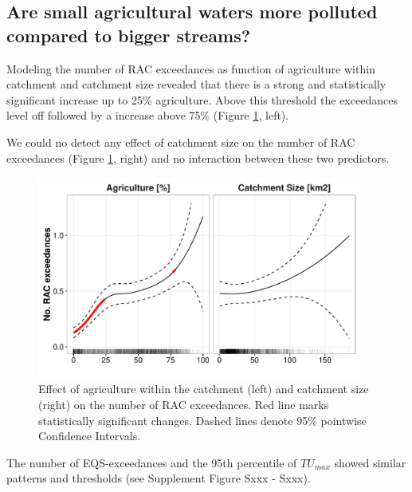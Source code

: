 \documentclass[journal=esthag,manuscript=article]{achemso}
\begin{document}
\subsection{Are small agricultural waters more polluted compared to bigger streams?}

Modeling the number of RAC exceedances as function of agriculture within catchment and catchment size revealed that there is a strong and statistically significant increase up to 25\% agriculture.
Above this threshold the exceedances level off followed by a increase above 75\% (Figure \ref{fig:fig4}, left).

We could no detect any effect of catchment size on the number of RAC exceedances (Figure \ref{fig:fig4}, right) and no interaction between these two predictors.

\begin{figure}[ht]
  \includegraphics[width=0.95\textwidth]{figure4.pdf}
  \caption{Effect of agriculture within the catchment (left) and catchment size (right) on the number of RAC exceedances. Red line marks statistically significant changes. Dashed lines denote 95\% pointwise Confidence Intervals.
  }
  \label{fig:fig4}
\end{figure}

The number of EQS-exceedances and the 95th percentile of $TU_{max}$ showed similar patterns and thresholds (see Supplement Figure Sxxx - Sxxx). 
\end{document}
